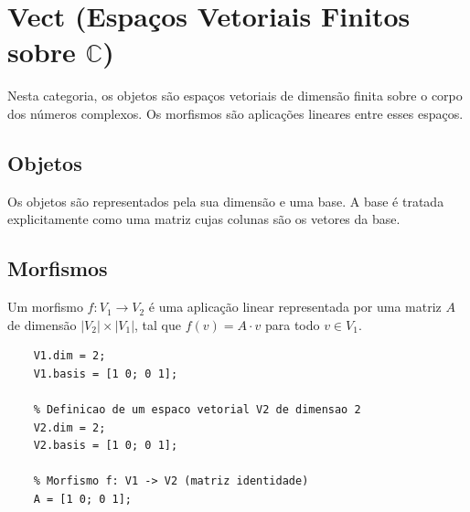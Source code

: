 \section{Vect (Espaços Vetoriais Finitos sobre \texorpdfstring{$\mathbb{C}$}{C})}
\label{sec:vect}

Nesta categoria, os objetos são espaços vetoriais de dimensão finita sobre o corpo dos números complexos. Os morfismos são aplicações lineares entre esses espaços.

\subsection{Objetos}
Os objetos são representados pela sua dimensão e uma base. A base é tratada explicitamente como uma matriz cujas colunas são os vetores da base.

\subsection{Morfismos}
Um morfismo $f: V_1 \to V_2$ é uma aplicação linear representada por uma matriz $A$ de dimensão $|V_2| \times |V_1|$, tal que $f(v) = A \cdot v$ para todo $v \in V_1$.

\begin{lstlisting}[style=matlab, caption={Exemplo de Espaco Vetorial e Morfismo}]
	% Definicao de um espaco vetorial V1 de dimensao 2
	V1.dim = 2;
	V1.basis = [1 0; 0 1];
	
	% Definicao de um espaco vetorial V2 de dimensao 2
	V2.dim = 2;
	V2.basis = [1 0; 0 1];
	
	% Morfismo f: V1 -> V2 (matriz identidade)
	A = [1 0; 0 1];
\end{lstlisting}